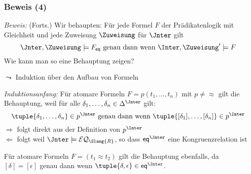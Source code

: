 \documentclass[aspectratio=1610,onlymath]{beamer}
\begin{document}
\begin{frame}[t]\frametitle{Beweis (4)}

% 

\emph{Beweis:} {\footnotesize(Forts.)}
Wir behaupten: Für jede Formel $F$ der Prädikatenlogik mit Gleichheit und jede Zuweisung $\Zuweisung$ für $\Jnter$ gilt
\[ \Jnter,\Zuweisung\models F_{\eqpred} \text{ genau dann wenn } \Inter,\Zuweisung'\models F \]
Wie kann man so eine Behauptung zeigen?\bigskip\pause

$\leadsto$ \alert{Induktion über den Aufbau von Formeln}\bigskip

\emph{Induktionsanfang:} Für atomare Formeln $F=p(t_1,\ldots,t_n)$ mit $p\neq{\approx}$ gilt die Behauptung,
weil für alle $\delta_1,\ldots,\delta_n\in\Delta^\Jnter$ gilt:
\[ \tuple{\delta_1,\ldots,\delta_n}\in p^\Jnter \text{ genau dann wenn } \tuple{[\delta_1],\ldots,[\delta_n]}\in p^\Inter \]
$\Rightarrow$ folgt direkt aus der Definition von $p^\Inter$\\
$\Leftarrow$ folgt weil $\Jnter\models\mathcal{EQ}_{\Slang{R}}$, so dass $\eqpred^\Jnter$ eine Kongruenzrelation ist
\bigskip\pause

Für atomare Formeln $F=(t_1\approx t_2)$ gilt die Behauptung ebenfalls, da $[\delta]=[\epsilon]$ genau dann wenn $\tuple{\delta,\epsilon}\in\eqpred^\Jnter$.
\end{frame}
\end{document}
